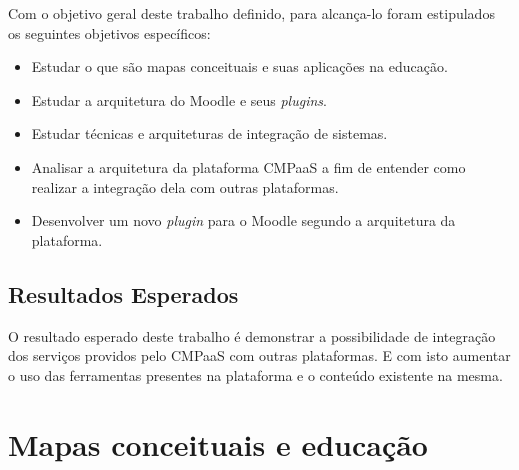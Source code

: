 \documentclass[
	12pt,				%
	openright,			%
	oneside,			%
	a4paper,			%
	english,			%
	french,				%
	spanish,			%
	brazil				%
	]{abntex2}
\begin{document}
Com o objetivo geral deste trabalho definido, para alcança-lo foram estipulados os seguintes objetivos específicos:

\begin{itemize}
	\item Estudar o que são mapas conceituais e suas aplicações na educação.
	\item Estudar a arquitetura do Moodle e seus \textit{plugins}.
	\item Estudar técnicas e arquiteturas de integração de sistemas.
	\item Analisar a arquitetura da plataforma CMPaaS a fim de entender como realizar a integração dela com outras plataformas.
	\item Desenvolver um novo \textit{plugin} para o Moodle segundo a arquitetura da plataforma.   
\end{itemize} 
 
\section{Resultados Esperados}

O resultado esperado deste trabalho é demonstrar a possibilidade de integração dos serviços providos pelo CMPaaS com outras plataformas. E com isto aumentar o uso das ferramentas presentes na plataforma e o conteúdo existente na mesma. 




\chapter{Mapas conceituais e educação}\label{cap-maps}
\end{document}
